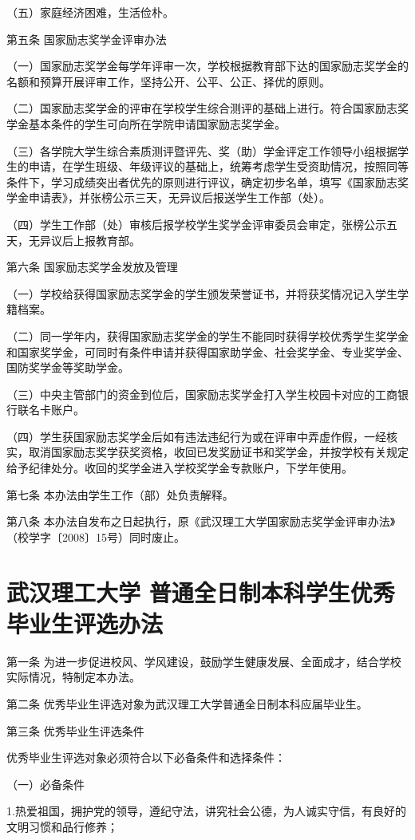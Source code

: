 \documentclass[UTF8,12pt,a4paper]{report}
\begin{document}
（五）家庭经济困难，生活俭朴。

第五条 国家励志奖学金评审办法

（一）国家励志奖学金每学年评审一次，学校根据教育部下达的国家励志奖学金的名额和预算开展评审工作，坚持公开、公平、公正、择优的原则。

（二）国家励志奖学金的评审在学校学生综合测评的基础上进行。符合国家励志奖学金基本条件的学生可向所在学院申请国家励志奖学金。

（三）各学院大学生综合素质测评暨评先、奖（助）学金评定工作领导小组根据学生的申请，在学生班级、年级评议的基础上，统筹考虑学生受资助情况，按照同等条件下，学习成绩突出者优先的原则进行评议，确定初步名单，填写《国家励志奖学金申请表》，并张榜公示三天，无异议后报送学生工作部（处）。

（四）学生工作部（处）审核后报学校学生奖学金评审委员会审定，张榜公示五天，无异议后上报教育部。

第六条 国家励志奖学金发放及管理

（一）学校给获得国家励志奖学金的学生颁发荣誉证书，并将获奖情况记入学生学籍档案。

（二）同一学年内，获得国家励志奖学金的学生不能同时获得学校优秀学生奖学金和国家奖学金，可同时有条件申请并获得国家助学金、社会奖学金、专业奖学金、国防奖学金等奖助学金。

（三）中央主管部门的资金到位后，国家励志奖学金打入学生校园卡对应的工商银行联名卡账户。

（四）学生获国家励志奖学金后如有违法违纪行为或在评审中弄虚作假，一经核实，取消国家励志奖学获奖资格，收回已发奖励证书和奖学金，并按学校有关规定给予纪律处分。收回的奖学金进入学校奖学金专款账户，下学年使用。

第七条 本办法由学生工作（部）处负责解释。

第八条 本办法自发布之日起执行，原《武汉理工大学国家励志奖学金评审办法》（校学字〔2008〕15号）同时废止。
\chapter{武汉理工大学 普通全日制本科学生优秀毕业生评选办法}
第一条 为进一步促进校风、学风建设，鼓励学生健康发展、全面成才，结合学校实际情况，特制定本办法。

第二条 优秀毕业生评选对象为武汉理工大学普通全日制本科应届毕业生。

第三条 优秀毕业生评选条件

优秀毕业生评选对象必须符合以下必备条件和选择条件：

（一）必备条件

1.热爱祖国，拥护党的领导，遵纪守法，讲究社会公德，为人诚实守信，有良好的文明习惯和品行修养；
\end{document}
